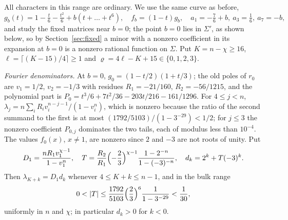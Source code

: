\documentclass{amsart}
\theoremstyle{definition}
\theoremstyle{remark}
\numberwithin{equation}{section}
\begin{document}
All characters in this range are ordinary. We use the same curve as before,
\[
  g_b(t)=1-\tfrac t6-\tfrac{t^2}6+b(t+\dots+t^6),\quad f_b=(1-t)g_b,\quad
  a_1=-\tfrac76+b,\ a_3=\tfrac16,\ a_7=-b,
\]
and study the fixed matrices near $b=0$; the point $b=0$ lies in $\Sigma'$, as shown below,
so by Section~\ref{sec:fixed} a minor with a nonzero coefficient in its expansion at $b=0$ is
a nonzero rational function on $\Sigma$. Put
$K=n-\chi\ge16$, $\ell=\lceil(K-15)/4\rceil\ge1$ and $\varrho=4\ell-K+15\in\{0,1,2,3\}$.

\emph{Fourier denominators.} At $b=0$, $g_0=(1-t/2)(1+t/3)$; the old poles of $r_0$ are
$v_1=1/2$, $v_2=-1/3$ with residues $R_1=-21/160$, $R_2=-56/1215$, and the polynomial
part is $P_0=t^3/6+7t^2/36-203t/216-161/1296$. For $4\le j<n$,
$\lambda_j=n\sum_iR_iv_i^{n-j-1}/(1-v_i^n)$, which is nonzero because the ratio of the
second summand to the first is at most $(1792/5103)/(1-3^{-29})<1/2$; for $j\le3$ the
nonzero coefficient $P_{0,j}$ dominates the two tails, each of modulus less than
$10^{-4}$. The values $f_0(x)$, $x\ne1$, are nonzero since $2$ and $-3$ are not roots of
unity. Put
\[
  D_1=\frac{nR_1v_1^{\chi-1}}{1-v_1^n},\quad
  T=\frac{R_2}{R_1}\Bigl(-\frac23\Bigr)^{\chi-1}\frac{1-2^{-n}}{1-(-3)^{-n}},\quad
  d_k=2^k+T(-3)^k .
\]
Then $\lambda_{K+k}=D_1d_k$ whenever $4\le K+k\le n-1$, and in the bulk range
\begin{equation}\label{eq:Tbound}
  0<|T|\le\frac{1792}{5103}\Bigl(\frac23\Bigr)^6\frac1{1-3^{-29}}<\frac1{30},
\end{equation}
uniformly in $n$ and $\chi$; in particular $d_k>0$ for $k<0$.
\end{document}
